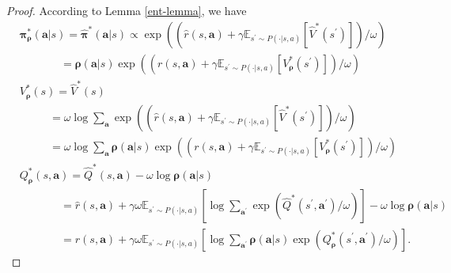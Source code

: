 \documentclass{article}
\begin{document}
\begin{proof}
		According to Lemma \ref{ent-lemma}, we have
		\begin{align*}
			& {\bm{\pi}}^*_{\bm{\rho}}(\bm{a}|s)   = \hat{{\bm{\pi}}}^*(\bm{a}|s)  \propto 
			\exp\left( \left( \hat{r}(s,\bm{a}) + \gamma \mathbb{E}_{s^\prime \sim P(\cdot | s, a)}\left[ \hat{V}^*(s^{\prime})\right]   \right) / \omega \right) \\
			& \qquad\quad\,\,\,\, =  {\bm{\rho}}(\bm{a}|s) \exp\left( \left( r(s,\bm{a}) + \gamma \mathbb{E}_{s^\prime \sim P(\cdot | s, a)}\left[ V^*_{\bm{\rho}}(s^{\prime})\right]   \right) / \omega \right)  \\
			& V^*_{\bm{\rho}}(s)   = \hat{V}^*(s) \\ 
			& \qquad\,\,\,\, = \omega \log \sum_{\bm{a}} \exp\left( \left( \hat{r}(s,\bm{a}) + \gamma \mathbb{E}_{s^\prime \sim P(\cdot | s, a)}\left[ \hat{V}^*(s^{\prime})\right]   \right) / \omega \right) \\
			& \qquad\,\,\,\,= \omega \log \sum_{\bm{a}} {\bm{\rho}}(\bm{a}|s) \exp\left( \left( r(s,\bm{a}) + \gamma \mathbb{E}_{s^\prime \sim P(\cdot | s, a)}\left[ V^*_{\bm{\rho}}(s^{\prime})\right]   \right) / \omega \right) \\
			& Q_{\bm{\rho}}^*(s,\bm{a})   = \hat{Q}^*(s,\bm{a}) - \omega \log {\bm{\rho}}(\bm{a}|s) \\
			& \qquad\quad\,\,\,\, =  \hat{r}(s,\bm{a}) + \gamma \omega \mathbb{E}_{s^\prime \sim P(\cdot | s, a)}\left[ \log \sum_{\bm{a^{\prime}}}  \exp \left( \hat{Q}^*(s^{\prime},\bm{a}^{\prime}) / \omega \right)  \right]  - \omega \log {\bm{\rho}}(\bm{a}|s) \\
			& \qquad\quad\,\,\,\, =  r(s,\bm{a}) + \gamma \omega \mathbb{E}_{s^\prime \sim P(\cdot | s, a)}\left[ \log \sum_{\bm{a^{\prime}}} {\bm{\rho}}(\bm{a}|s) \exp \left( Q^*_{\bm{\rho}}(s^{\prime},\bm{a}^{\prime}) / \omega \right)  \right] .
		\end{align*}
		
	\end{proof}
\end{document}
